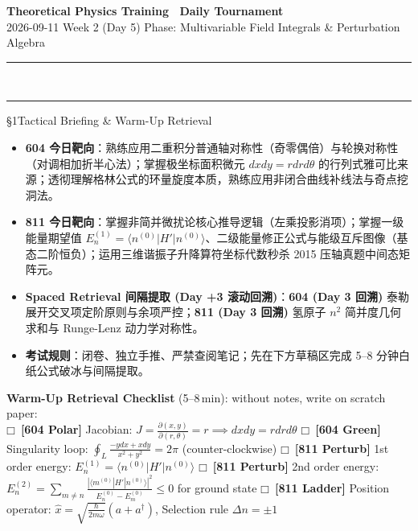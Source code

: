 \documentclass[a4paper,11pt]{article}
\newcommand{\checkbox}{\ensuremath{\mdlgwhtsquare}}
\newcommand{\alerttag}[1]{\textcolor{wine}{\sffamily\bfseries [#1]}}
\begin{document}
\begin{center}
  {\LARGE\bfseries\color{navy} Theoretical Physics Training \textperiodcentered\ Daily Tournament}\\[3pt]
  {\small\sffamily\color{mist} 2026-09-11 \quad\textbar\quad Week 2 (Day 5) \quad\textbar\quad Phase: Multivariable Field Integrals \& Perturbation Algebra}\\[-4pt]
  {\color{navy}\rule{\textwidth}{0.8pt}}\\[-11pt]
  {\color{border}\rule{\textwidth}{0.3pt}}
\end{center}

\vspace{-6pt}

\begin{briefing}{\S 1\quad Tactical Briefing \& Warm-Up Retrieval}
\begin{itemize}[leftmargin=1.5em, itemsep=2pt, topsep=1pt]
  \item \textbf{604 今日靶向}：熟练应用二重积分普通轴对称性（奇零偶倍）与轮换对称性（对调相加折半心法）；掌握极坐标面积微元 $dxdy = rdrd\theta$ 的行列式雅可比来源；透彻理解格林公式的环量旋度本质，熟练应用非闭合曲线补线法与奇点挖洞法。
  \item \textbf{811 今日靶向}：掌握非简并微扰论核心推导逻辑（左乘投影消项）；掌握一级能量期望值 $E_n^{(1)} = \langle n^{(0)}|H'|n^{(0)}\rangle$、二级能量修正公式与能级互斥图像（基态二阶恒负）；运用三维谐振子升降算符坐标代数秒杀 2015 压轴真题中间态矩阵元。
  \item \textbf{Spaced Retrieval 间隔提取 (Day +3 滚动回溯)}：\textbf{604 (Day 3 回溯)} 泰勒展开交叉项定阶原则与余项严控；\textbf{811 (Day 3 回溯)} 氢原子 $n^2$ 简并度几何求和与 Runge-Lenz 动力学对称性。
  \item \textbf{考试规则}：闭卷、独立手推、严禁查阅笔记；先在下方草稿区完成 5--8 分钟白纸公式破冰与间隔提取。
\end{itemize}

\vspace{1mm}
\textbf{Warm-Up Retrieval Checklist} (5--8\,min): without notes, write on scratch paper:\\
\checkbox\ \alerttag{604 Polar} Jacobian: $J = \frac{\partial(x,y)}{\partial(r,\theta)} = r \implies dxdy = rdrd\theta$ \quad
\checkbox\ \alerttag{604 Green} Singularity loop: $\oint_L \frac{-ydx+xdy}{x^2+y^2} = 2\pi$ (counter-clockwise) \quad
\checkbox\ \alerttag{811 Perturb} 1st order energy: $E_n^{(1)} = \langle n^{(0)}|H'|n^{(0)}\rangle$ \quad
\checkbox\ \alerttag{811 Perturb} 2nd order energy: $E_n^{(2)} = \sum_{m \ne n} \frac{|\langle m^{(0)}|H'|n^{(0)}\rangle|^2}{E_n^{(0)}-E_m^{(0)}} \le 0$ for ground state \quad
\checkbox\ \alerttag{811 Ladder} Position operator: $\hat{x} = \sqrt{\frac{\hbar}{2m\omega}}(a + a^\dagger)$, Selection rule $\Delta n = \pm 1$
\end{briefing}
\end{document}
